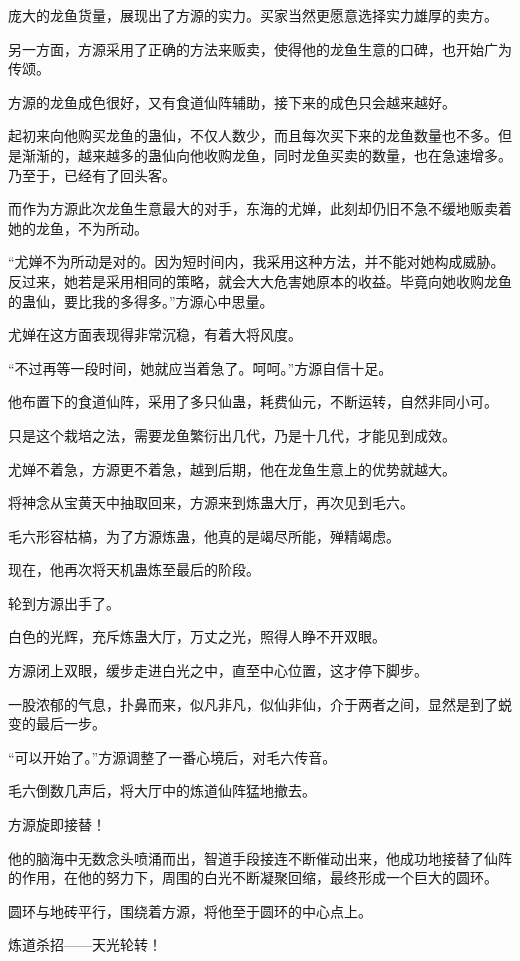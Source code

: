 \begin{this_body}
庞大的龙鱼货量，展现出了方源的实力。买家当然更愿意选择实力雄厚的卖方。

另一方面，方源采用了正确的方法来贩卖，使得他的龙鱼生意的口碑，也开始广为传颂。

方源的龙鱼成色很好，又有食道仙阵辅助，接下来的成色只会越来越好。

起初来向他购买龙鱼的蛊仙，不仅人数少，而且每次买下来的龙鱼数量也不多。但是渐渐的，越来越多的蛊仙向他收购龙鱼，同时龙鱼买卖的数量，也在急速增多。乃至于，已经有了回头客。

而作为方源此次龙鱼生意最大的对手，东海的尤婵，此刻却仍旧不急不缓地贩卖着她的龙鱼，不为所动。

“尤婵不为所动是对的。因为短时间内，我采用这种方法，并不能对她构成威胁。反过来，她若是采用相同的策略，就会大大危害她原本的收益。毕竟向她收购龙鱼的蛊仙，要比我的多得多。”方源心中思量。

尤婵在这方面表现得非常沉稳，有着大将风度。

“不过再等一段时间，她就应当着急了。呵呵。”方源自信十足。

他布置下的食道仙阵，采用了多只仙蛊，耗费仙元，不断运转，自然非同小可。

只是这个栽培之法，需要龙鱼繁衍出几代，乃是十几代，才能见到成效。

尤婵不着急，方源更不着急，越到后期，他在龙鱼生意上的优势就越大。

将神念从宝黄天中抽取回来，方源来到炼蛊大厅，再次见到毛六。

毛六形容枯槁，为了方源炼蛊，他真的是竭尽所能，殚精竭虑。

现在，他再次将天机蛊炼至最后的阶段。

轮到方源出手了。

白色的光辉，充斥炼蛊大厅，万丈之光，照得人睁不开双眼。

方源闭上双眼，缓步走进白光之中，直至中心位置，这才停下脚步。

一股浓郁的气息，扑鼻而来，似凡非凡，似仙非仙，介于两者之间，显然是到了蜕变的最后一步。

“可以开始了。”方源调整了一番心境后，对毛六传音。

毛六倒数几声后，将大厅中的炼道仙阵猛地撤去。

方源旋即接替！

他的脑海中无数念头喷涌而出，智道手段接连不断催动出来，他成功地接替了仙阵的作用，在他的努力下，周围的白光不断凝聚回缩，最终形成一个巨大的圆环。

圆环与地砖平行，围绕着方源，将他至于圆环的中心点上。

炼道杀招——天光轮转！


\end{this_body}
